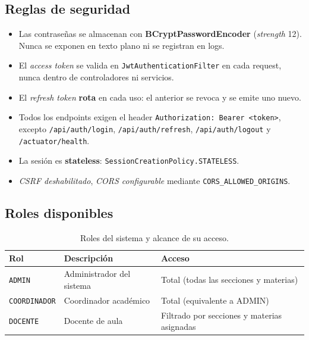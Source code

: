 \documentclass[11pt,a4paper,oneside]{article}
\newcommand{\code}[1]{\texttt{\small #1}}
\begin{document}
\subsection{Reglas de seguridad}

\begin{ataraInfo}
\begin{itemize}[leftmargin=*]
  \item Las contraseñas se almacenan con \textbf{BCryptPasswordEncoder} (\emph{strength} 12).
        Nunca se exponen en texto plano ni se registran en logs.
  \item El \emph{access token} se valida en \code{JwtAuthenticationFilter} en cada request,
        nunca dentro de controladores ni servicios.
  \item El \emph{refresh token} \textbf{rota} en cada uso: el anterior se revoca y se emite
        uno nuevo.
  \item Todos los endpoints exigen el header \code{Authorization: Bearer <token>}, excepto
        \code{/api/auth/login}, \code{/api/auth/refresh}, \code{/api/auth/logout} y
        \code{/actuator/health}.
  \item La sesión es \textbf{stateless}: \code{SessionCreationPolicy.STATELESS}.
  \item \emph{CSRF deshabilitado}, \emph{CORS configurable} mediante
        \code{CORS\_ALLOWED\_ORIGINS}.
\end{itemize}
\end{ataraInfo}

\subsection{Roles disponibles}

\begin{table}[h]
\centering\renewcommand{\arraystretch}{1.2}\small
\begin{tabular}{@{}p{2.8cm} p{4.5cm} p{6.2cm}@{}}
\toprule
\textbf{Rol} & \textbf{Descripción} & \textbf{Acceso} \\
\midrule
\code{ADMIN}        & Administrador del sistema   & Total (todas las secciones y materias) \\
\code{COORDINADOR}  & Coordinador académico       & Total (equivalente a ADMIN) \\
\code{DOCENTE}      & Docente de aula             & Filtrado por secciones y materias asignadas \\
\bottomrule
\end{tabular}
\caption{Roles del sistema y alcance de su acceso.}
\end{table}
\end{document}
